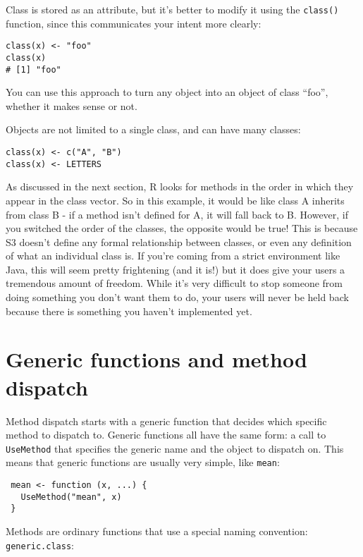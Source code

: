 Class is stored as an attribute, but it's better to modify it using the
\texttt{class()} function, since this communicates your intent more
clearly:

\begin{verbatim}
class(x) <- "foo"
class(x)
# [1] "foo"
\end{verbatim}

You can use this approach to turn any object into an object of class
``foo'', whether it makes sense or not.

Objects are not limited to a single class, and can have many classes:

\begin{verbatim}
class(x) <- c("A", "B")
class(x) <- LETTERS
\end{verbatim}

As discussed in the next section, R looks for methods in the order in
which they appear in the class vector. So in this example, it would be
like class A inherits from class B - if a method isn't defined for A, it
will fall back to B. However, if you switched the order of the classes,
the opposite would be true! This is because S3 doesn't define any formal
relationship between classes, or even any definition of what an
individual class is. If you're coming from a strict environment like
Java, this will seem pretty frightening (and it is!) but it does give
your users a tremendous amount of freedom. While it's very difficult to
stop someone from doing something you don't want them to do, your users
will never be held back because there is something you haven't
implemented yet.

\section{Generic functions and method dispatch}

Method dispatch starts with a generic function that decides which
specific method to dispatch to. Generic functions all have the same
form: a call to \texttt{UseMethod} that specifies the generic name and
the object to dispatch on. This means that generic functions are usually
very simple, like \texttt{mean}:

\begin{verbatim}
 mean <- function (x, ...) {
   UseMethod("mean", x)
 }
\end{verbatim}

Methods are ordinary functions that use a special naming convention:
\texttt{generic.class}:

